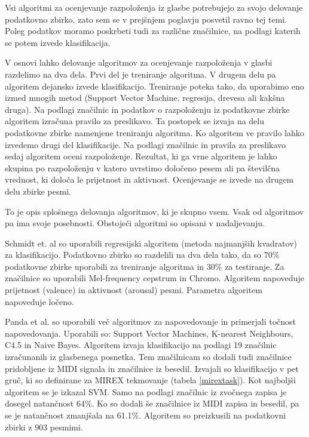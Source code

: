 \documentclass[a4paper, 12pt]{book}
\begin{document}
{Vsi algoritmi za ocenjevanje razpoloženja iz glasbe potrebujejo za svojo delovanje podatkovno zbirko, zato sem se v prejšnjem poglavju posvetil ravno tej temi. Poleg podatkov moramo poskrbeti tudi za različne značilnice, na podlagi katerih se potem izvede klasifikacija. 

V osnovi lahko delovanje algoritmov za ocenjevanje razpoloženja v glasbi razdelimo na dva dela. Prvi del je treniranje algoritma. V drugem delu pa algoritem dejansko izvede klasifikacijo. Treniranje poteka tako, da uporabimo eno izmed mnogih metod (Support Vector Machine, regresija, drevesa ali kakšna druga). Na podlagi značilnic in podatkov o razpoloženju iz podatkovne zbirke algoritem izračuna pravilo za preslikavo. Ta postopek se izvaja na delu podatkovne zbirke namenjene treniranju algoritma. Ko algoritem ve pravilo lahko izvedemo drugi del klasifikacije. Na podlagi značilnic in pravila za preslikavo sedaj algoritem oceni razpoloženje. Rezultat, ki ga vrne algoritem je lahko skupina po razpoloženju v katero uvrstimo določeno pesem ali pa številčna vrednost, ki določa le prijetnost in aktivnost. Ocenjevanje se izvede na drugem delu zbirke pesmi. 

To je opis splošnega delovanja algoritmov, ki je skupno vsem. Vsak od algoritmov pa ima svoje posebnosti. Obstoječi algoritmi so opisani v nadaljevanju. 

Schmidt et. al \cite{schmidt2009projection} so uporabili regresijski algoritem (metoda najmanjših kvadratov) za klasifikacijo. Podatkovno zbirko so razdelili na dva dela tako, da so 70\% podatkovne zbirke uporabili za treniranje algoritma in 30\% za testiranje. Za značilnice so uporabili Mel-frequency cepstrum in Chromo. Algoritem napoveduje prijetnost (valence) in aktivnost (arousal) pesmi. Parametra algoritem napoveduje ločeno. 

Panda et al. \cite{panda2013multi} so uporabili več algoritmov za napovedovanje in primerjali točnost napovedovanja. Uporabili so: Support Vector Machines, K-nearest Neighbours, C4.5 in Naive Bayes. Algoritem izvaja klasifikacijo na podlagi 19 značilnic izračunanih iz glasbenega posnetka. Tem značilnicam so dodali tudi značilnice pridobljene iz MIDI signala in značilnice iz besedil. Izvajali so klasifikacijo v pet gruč, ki so definirane za MIREX tekmovanje (tabela \ref{mirextask}).  Kot najboljši algoritem se je izkazal SVM. Samo na podlagi značilnic iz zvočnega zapisa je dosegel natančnost 64\%. Ko so dodali še značilnice iz MIDI zapisa in besedil, pa se je natančnost zmanjšala na 61.1\%. Algoritem so preizkusili na podatkovni zbirki z 903 pesmimi. 

}
\end{document}
